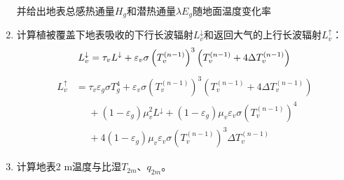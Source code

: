 \begin{enumerate}
    并给出地表总感热通量$H_g$和潜热通量$\lambda E_g$随地面温度变化率
    \item 计算植被覆盖下地表吸收的下行长波辐射$L_{v}^\downarrow$和返回大气的上行长波辐射$L_v ^\uparrow$：
    \begin{equation}
        L_{v} ^\downarrow =  \tau_{v} L ^\downarrow+\varepsilon_{v}\sigma \left (T_{v}^{(n - 1)}\right)^3\left( T_{v}^{(n - 1)} + 4\Delta T_{v}^{(n - 1)} \right)\\
    \end{equation}
    \begin{equation}
    \begin{aligned}
        L_{v}^ \uparrow &=  \tau_{v} \varepsilon_{g} \sigma T_{g}^{4}+ \varepsilon_{v}\sigma \left ( T_{v}^{(n - 1)}\right )^3\left( T_{v}^{(n - 1)} + 4\Delta T_{v}^{(n - 1)} \right) \\[1ex]
&\mathrel{\phantom{=}} + \left ( 1- \varepsilon_{g} \right)\mu_{v}^2 L ^\downarrow + \left ( 1- \varepsilon_{g} \right) \mu_{v} \varepsilon_{v} \sigma \left (T_{v}^{(n - 1)}\right) ^4 \\[1ex]
&\mathrel{\phantom{=}} + 4 \left ( 1- \varepsilon_{g} \right) \mu_{v} \varepsilon_{v} \sigma \left (T_{v}^{(n - 1)}\right)^3 \Delta T_{v}^{(n - 1)}
    \end{aligned}
    \end{equation}
    \item 计算地表2 m温度与比湿$T_{2m}$、$q_{2m}$。
\end{enumerate}

